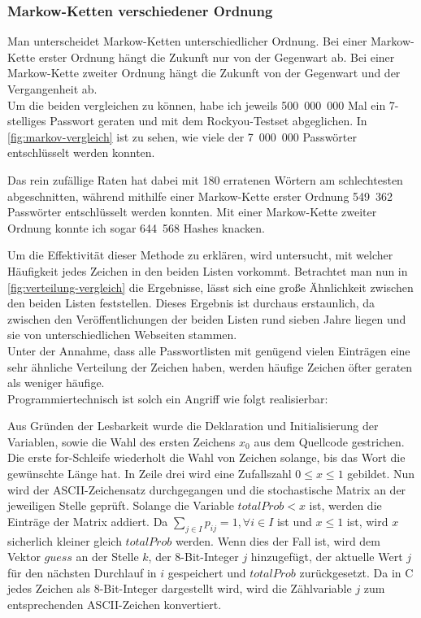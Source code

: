 \documentclass[12pt,a4paper]{scrartcl}
\newcommand{\spar}{\par\vspace{10pt}\noindent}
\numberwithin{equation}{section}
\numberwithin{myalgctr}{section}
\numberwithin{mytheoremctr}{section}
\begin{document}
	\subsubsection{Markow-Ketten verschiedener Ordnung} %
	Man unterscheidet Markow-Ketten unterschiedlicher Ordnung. Bei einer Markow-Kette erster Ordnung hängt die Zukunft nur von der Gegenwart ab. Bei einer Markow-Kette zweiter Ordnung hängt die Zukunft von der Gegenwart und der Vergangenheit ab.\\
	Um die beiden vergleichen zu können, habe ich jeweils 500~000~000 Mal ein 7-stelliges Passwort geraten und mit dem Rockyou-Testset abgeglichen. In \cref{fig:markov-vergleich} ist zu sehen, wie viele der 7~000~000 Passwörter entschlüsselt werden konnten.
	\spar
	Das rein zufällige Raten hat dabei mit 180 erratenen Wörtern am schlechtesten abgeschnitten, während mithilfe einer Markow-Kette erster Ordnung 549~362 Passwörter entschlüsselt werden konnten. Mit einer Markow-Kette zweiter Ordnung konnte ich sogar 644~568 Hashes knacken.\\
	\par	\noindent
	Um die Effektivität dieser Methode zu erklären, wird untersucht, mit welcher Häufigkeit jedes Zeichen in den beiden Listen vorkommt. Betrachtet man nun in \cref{fig:verteilung-vergleich} die Ergebnisse, lässt sich eine große Ähnlichkeit zwischen den beiden Listen feststellen.
	Dieses Ergebnis ist durchaus erstaunlich, da zwischen den Veröffentlichungen der beiden Listen rund sieben Jahre liegen und sie von unterschiedlichen Webseiten stammen.\\
	Unter der Annahme, dass alle Passwortlisten mit genügend vielen Einträgen eine sehr ähnliche Verteilung der Zeichen haben, werden häufige Zeichen öfter geraten als weniger häufige.\\
	\img[.25cm][1]{verteilung-vergleich}{Zeichen mit $h_n(A) > 0.5\%$}
	\noindent
	Programmiertechnisch ist solch ein Angriff wie folgt realisierbar:
	
	Aus Gründen der Lesbarkeit wurde die Deklaration und Initialisierung der Variablen, sowie die Wahl des ersten Zeichens $x_0$ aus dem Quellcode gestrichen.\\
	Die erste for-Schleife wiederholt die Wahl von Zeichen solange, bis das Wort die gewünschte Länge hat. In Zeile drei wird eine Zufallszahl $0\leq x\leq 1$ gebildet. Nun wird der ASCII-Zeichensatz durchgegangen und die stochastische Matrix an der jeweiligen Stelle geprüft. Solange die Variable $totalProb < x$ ist, werden die Einträge der Matrix addiert. Da $\sum_{j\in I}p_{ij} = 1,\forall i\in I$ ist und $x\leq 1$ ist, wird $x$ sicherlich kleiner gleich $totalProb$ werden. Wenn dies der Fall ist, wird dem Vektor $guess$ an der Stelle $k$, der 8-Bit-Integer $j$ hinzugefügt, der aktuelle Wert $j$ für den nächsten Durchlauf in $i$ gespeichert und $totalProb$ zurückgesetzt. Da in C jedes Zeichen als 8-Bit-Integer dargestellt wird, wird die Zählvariable $j$ zum entsprechenden ASCII-Zeichen konvertiert.
	\newpage
\end{document}
